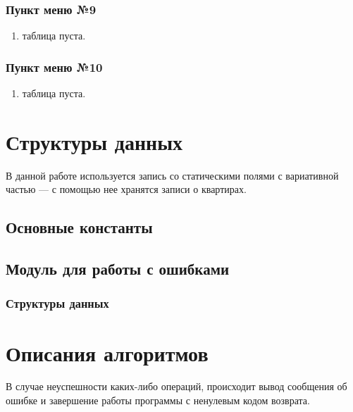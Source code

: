 \documentclass[a4paper,12pt]{extarticle}
\begin{document}
\subsubsection{Пункт меню №9}
\begin{enumerate}
    \item таблица пуста.
\end{enumerate}

\subsubsection{Пункт меню №10}
\begin{enumerate}
    \item таблица пуста.
\end{enumerate}

\newpage

\section{Структуры данных}
В данной работе используется запись со статическими полями с вариативной частью --- с помощью нее хранятся записи о квартирах. 

\subsection{Основные константы}
\begin{verbbox}

\end{verbbox}
\setlength{\fboxsep}{5pt}
\setlength{\fboxsep}{10pt}
\fbox{\theverbbox}

\subsection{Модуль для работы с ошибками}
\subsubsection{Структуры данных}
\begin{verbbox}

\end{verbbox}
\setlength{\fboxsep}{5pt}
\setlength{\fboxsep}{10pt}
\fbox{\theverbbox}




\newpage
\section{Описания алгоритмов}
В случае неуспешности каких-либо операций, происходит вывод сообщения об ошибке и завершение работы программы с ненулевым кодом возврата.
\end{document}
